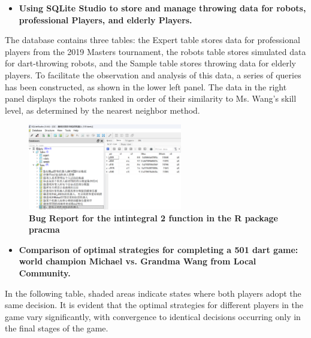 \documentclass[cjjs]{ipart}
\theoremstyle{plain}
\begin{document}
\begin{itemize}
    \item \textbf{Using SQLite Studio to store and manage throwing data for robots, professional Players, and elderly Players.} 
\end{itemize} 

\text The database contains three tables: the Expert table stores data for professional players from the 2019 Masters tournament, the robots table stores simulated data for dart-throwing robots, and the Sample table stores throwing data for elderly players. To facilitate the observation and analysis of this data, a series of queries has been constructed, as shown in the lower left panel. The data in the right panel displays the robots ranked in order of their similarity to Ms. Wang's skill level, as determined by the nearest neighbor method.

\begin{figure}[H]
    \centering
    \includegraphics[width=0.60\textwidth]{13.png} 
    \caption{\textbf{Bug Report for the intintegral 2 function in the R package pracma}}
    \label{fig:13}
\end{figure}
\newpage
\begin{itemize}
    \item \textbf{Comparison of optimal strategies for completing a 501 dart game: world champion Michael vs. Grandma Wang from Local Community.}
\end{itemize}

\text In the following table, shaded areas indicate states where both players adopt the same decision. It is evident that the optimal strategies for different players in the game vary significantly, with convergence to identical decisions occurring only in the final stages of the game.   
\end{document}
